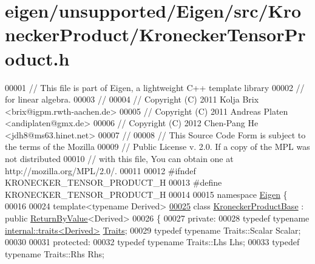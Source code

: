 \hypertarget{eigen_2unsupported_2_eigen_2src_2_kronecker_product_2_kronecker_tensor_product_8h_source}{}\section{eigen/unsupported/\+Eigen/src/\+Kronecker\+Product/\+Kronecker\+Tensor\+Product.h}
\label{eigen_2unsupported_2_eigen_2src_2_kronecker_product_2_kronecker_tensor_product_8h_source}

\begin{DoxyCode}
00001 \textcolor{comment}{// This file is part of Eigen, a lightweight C++ template library}
00002 \textcolor{comment}{// for linear algebra.}
00003 \textcolor{comment}{//}
00004 \textcolor{comment}{// Copyright (C) 2011 Kolja Brix <brix@igpm.rwth-aachen.de>}
00005 \textcolor{comment}{// Copyright (C) 2011 Andreas Platen <andiplaten@gmx.de>}
00006 \textcolor{comment}{// Copyright (C) 2012 Chen-Pang He <jdh8@ms63.hinet.net>}
00007 \textcolor{comment}{//}
00008 \textcolor{comment}{// This Source Code Form is subject to the terms of the Mozilla}
00009 \textcolor{comment}{// Public License v. 2.0. If a copy of the MPL was not distributed}
00010 \textcolor{comment}{// with this file, You can obtain one at http://mozilla.org/MPL/2.0/.}
00011 
00012 \textcolor{preprocessor}{#ifndef KRONECKER\_TENSOR\_PRODUCT\_H}
00013 \textcolor{preprocessor}{#define KRONECKER\_TENSOR\_PRODUCT\_H}
00014 
00015 \textcolor{keyword}{namespace }\hyperlink{namespace_eigen}{Eigen} \{
00016 
00024 \textcolor{keyword}{template}<\textcolor{keyword}{typename} Derived>
\hyperlink{class_eigen_1_1_kronecker_product_base}{00025} \textcolor{keyword}{class }\hyperlink{class_eigen_1_1_kronecker_product_base}{KroneckerProductBase} : \textcolor{keyword}{public} \hyperlink{group___core___module_class_eigen_1_1_return_by_value}{ReturnByValue}<Derived>
00026 \{
00027   \textcolor{keyword}{private}:
00028     \textcolor{keyword}{typedef} \textcolor{keyword}{typename} \hyperlink{struct_eigen_1_1internal_1_1traits}{internal::traits<Derived>} \hyperlink{struct_eigen_1_1internal_1_1traits}{Traits};
00029     \textcolor{keyword}{typedef} \textcolor{keyword}{typename} Traits::Scalar Scalar;
00030 
00031   \textcolor{keyword}{protected}:
00032     \textcolor{keyword}{typedef} \textcolor{keyword}{typename} Traits::Lhs Lhs;
00033     \textcolor{keyword}{typedef} \textcolor{keyword}{typename} Traits::Rhs Rhs;

\end{DoxyCode}

